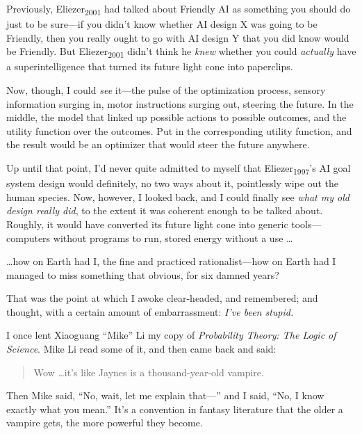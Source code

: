 {
 Previously, Eliezer\textsubscript{2001} had talked about Friendly
AI as something you should do just to be sure---if you
didn't know whether AI design X was going to be
Friendly, then you really ought to go with AI design Y that you did
know would be Friendly. But Eliezer\textsubscript{2001}
didn't think he \textit{knew} whether you could
\textit{actually} have a superintelligence that turned its future light
cone into paperclips.}

{
 Now, though, I could \textit{see} it---the pulse of the
optimization process, sensory information surging in, motor
instructions surging out, steering the future. In the middle, the model
that linked up possible actions to possible outcomes, and the utility
function over the outcomes. Put in the corresponding utility function,
and the result would be an optimizer that would steer the future
anywhere.}

{
 Up until that point, I'd never quite admitted to
myself that Eliezer\textsubscript{1997}'s AI goal
system design would definitely, no two ways about it, pointlessly wipe
out the human species. Now, however, I looked back, and I could finally
see \textit{what my old design really did}, to the extent it was
coherent enough to be talked about. Roughly, it would have converted
its future light cone into generic tools---computers without programs
to run, stored energy without a use \ldots}

{
 \ldots how on Earth had I, the fine and practiced rationalist---how
on Earth had I managed to miss something that obvious, for six damned
years?}

{
 That was the point at which I awoke clear-headed, and remembered;
and thought, with a certain amount of embarrassment:
\textit{I've been stupid.}}

\myendsectiontext


\bigskip


{
 I once lent Xiaoguang ``Mike''
Li my copy of \textit{Probability Theory: The Logic of Science}. Mike
Li read some of it, and then came back and said:}

\begin{quote}
{
 Wow \ldots it's like Jaynes is a thousand-year-old
 vampire.}
\end{quote}

{
 Then Mike said, ``No, wait, let me explain
that---'' and I said, ``No, I know
exactly what you mean.'' It's a
convention in fantasy literature that the older a vampire gets, the
more powerful they become.}

